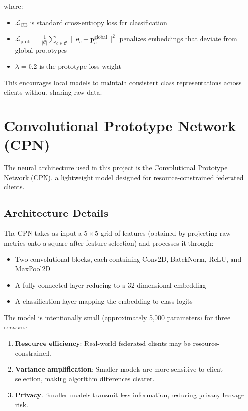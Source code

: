 where:
\begin{itemize}
    \item \(\mathcal{L}_{\text{CE}}\) is standard cross-entropy loss for classification
    \item \(\mathcal{L}_{\text{proto}} = \frac{1}{|\mathcal{C}|} \sum_{c \in \mathcal{C}} \| \mathbf{e}_c - \mathbf{p}_c^{\text{global}} \|^2\) penalizes embeddings that deviate from global prototypes
    \item \(\lambda = 0.2\) is the prototype loss weight
\end{itemize}

This encourages local models to maintain consistent class representations across clients without sharing raw data.

\section{Convolutional Prototype Network (CPN)}

The neural architecture used in this project is the Convolutional Prototype Network (CPN), a lightweight model designed for resource-constrained federated clients.

\subsection{Architecture Details}

The CPN takes as input a \(5 \times 5\) grid of features (obtained by projecting raw metrics onto a square after feature selection) and processes it through:

\begin{itemize}
    \item Two convolutional blocks, each containing Conv2D, BatchNorm, ReLU, and MaxPool2D
    \item A fully connected layer reducing to a 32-dimensional embedding
    \item A classification layer mapping the embedding to class logits
\end{itemize}

The model is intentionally small (approximately 5,000 parameters) for three reasons:

\begin{enumerate}
    \item \textbf{Resource efficiency}: Real-world federated clients may be resource-constrained.
    \item \textbf{Variance amplification}: Smaller models are more sensitive to client selection, making algorithm differences clearer.
    \item \textbf{Privacy}: Smaller models transmit less information, reducing privacy leakage risk.
\end{enumerate}

